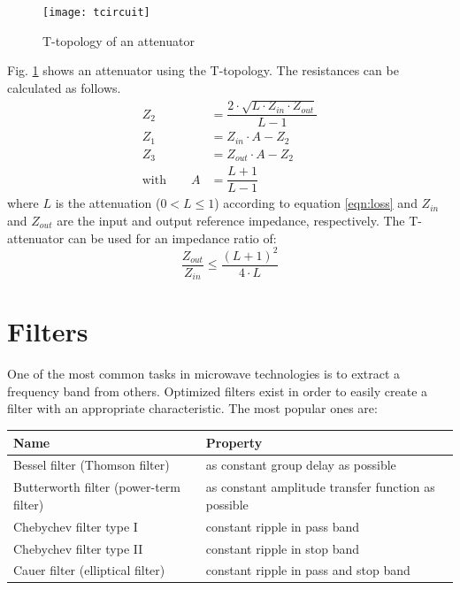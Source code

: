 \begin{figure}[ht]
\begin{center}
\texttt{[image: tcircuit]}
\end{center}
\caption{T-topology of an attenuator}
\label{fig:t_attenuator}
\end{figure}
\FloatBarrier

Fig. \ref{fig:t_attenuator} shows an attenuator using the
T-topology. The resistances can be calculated as follows.
\begin{align}
Z_2 & = \dfrac{2\cdot \sqrt{L\cdot Z_{in}\cdot Z_{out}}}{L - 1} \\
Z_1 & = Z_{in}\cdot A - Z_2 \\
Z_3 & = Z_{out}\cdot A - Z_2 \\
\textrm{with} \qquad A & = \dfrac{L + 1}{L - 1}
\end{align}
where $L$ is the attenuation ($0 < L\le 1$) according to
equation \ref{eqn:loss} and $Z_{in}$ and $Z_{out}$
are the input and output reference impedance, respectively.
The T-attenuator can be used for an impedance ratio of:
\begin{equation}
\dfrac{Z_{out}}{Z_{in}} \le \dfrac{(L+1)^2}{4\cdot L}
\end{equation}

\section{Filters}

One of the most common tasks in microwave technologies is to
extract a frequency band from others. Optimized filters exist
in order to easily create a filter with an appropriate characteristic.
The most popular ones are:

\addvspace{12pt}

\begin{tabular}{l|l}
Name & Property \\
\hline
Bessel filter (Thomson filter) & as constant group delay as possible \\
Butterworth filter (power-term filter) & as constant amplitude transfer function as possible \\
Chebychev filter type I & constant ripple in pass band \\
Chebychev filter type II & constant ripple in stop band \\
Cauer filter (elliptical filter) & constant ripple in pass and stop band \\
\end{tabular} 

